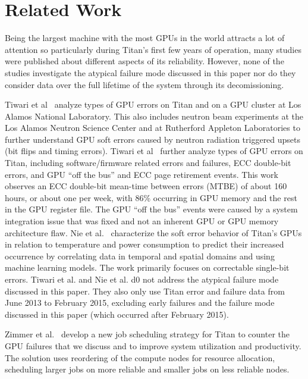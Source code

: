\section{Related Work}
\label{section:related}

Being the largest machine with the most GPUs in the world attracts a lot of attention so particularly during Titan's first few years of operation, many studies were published about different aspects of its reliability. However, none of the studies investigate the atypical failure mode discussed in this paper nor do they consider data over the full lifetime of the system through its decomissioning.

Tiwari et al~\cite{Tiwari15Experience,7056044} analyze types of GPU errors on Titan and on a GPU cluster at Los Alamos National Laboratory. This also includes neutron beam experiments at the Los Alamos Neutron Science Center and at Rutherford Appleton Laboratories to further understand GPU soft errors caused by neutron radiation triggered upsets (bit flips and timing errors).
%
Tiwari et al~\cite{10.1145/2807591.2807666} further analyze types of GPU errors on Titan, including software/firmware related errors and failures, ECC double-bit errors, and GPU ``off the bus'' and ECC page retirement events. This work observes an ECC double-bit mean-time between errors (MTBE) of about 160 hours, or about one per week, with 86\% occurring in GPU memory and the rest in the GPU register file. The GPU ``off the bus'' events were caused by a system integration issue that was fixed and not an inherent GPU or GPU memory architecture flaw.
%
Nie et al.~\cite{7446091,nie17characterizing,nie18machine} characterize the soft error behavior of Titan's GPUs in relation to temperature and power consumption to predict their increased occurrence by correlating data in temporal and spatial domains and using machine learning models. The work primarily focuses on correctable single-bit errors.
%
Tiwari et al. and Nie et al. d0 not address the atypical failure mode discussed in this paper. They also only use Titan error and failure data from June 2013 to February 2015, excluding early failures and the failure mode discussed in this paper (which occurred after February 2015).

Zimmer et al.~\cite{8665764} develop a new job scheduling strategy for Titan to counter the GPU failures that we discuss and to improve system utilization and productivity. The solution uses reordering of the compute nodes for resource allocation, scheduling larger jobs on more reliable and smaller jobs on less reliable nodes.

